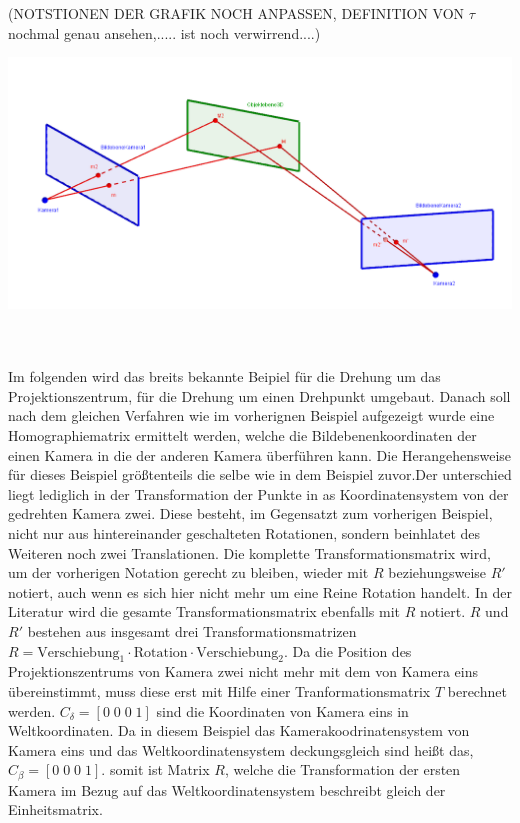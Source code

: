 (NOTSTIONEN DER GRAFIK NOCH ANPASSEN, DEFINITION VON $\tau$ nochmal genau ansehen,..... ist noch verwirrend....)

\begin{minipage}{\linewidth}
	\centering
	\includegraphics[width=1.\linewidth]{images/HomographieGrafik.png}
\end{minipage}\\ \\


Im folgenden wird das breits bekannte Beipiel für die Drehung um das Projektionszentrum, für die Drehung um einen Drehpunkt umgebaut. Danach soll nach dem gleichen Verfahren wie im vorherignen Beispiel aufgezeigt wurde eine Homographiematrix ermittelt werden, welche die Bildebenenkoordinaten der einen Kamera in die der anderen Kamera überführen kann. Die Herangehensweise für  dieses Beispiel größtenteils die selbe wie in dem Beispiel zuvor.Der unterschied liegt lediglich in der Transformation der Punkte in as Koordinatensystem von der gedrehten Kamera zwei. Diese besteht, im Gegensatzt zum vorherigen Beispiel, nicht nur aus hintereinander geschalteten Rotationen, sondern beinhlatet des Weiteren noch zwei Translationen. Die komplette Transformationsmatrix wird, um der vorherigen Notation gerecht zu bleiben, wieder mit $R$ beziehungsweise $R'$ notiert, auch wenn es sich hier nicht mehr um eine Reine Rotation handelt. In der Literatur wird die gesamte Transformationsmatrix ebenfalls mit $R$ notiert\cite{HZ,Elements,Schwarz}. $R$ und $R'$ bestehen aus insgesamt drei Transformationsmatrizen \ensuremath{R = \text{Verschiebung}_1 \cdot \text{Rotation} \cdot \text{Verschiebung}_2}. Da die Position des Projektionszentrums von Kamera zwei nicht mehr mit dem von Kamera eins übereinstimmt, muss diese erst mit Hilfe einer Tranformationsmatrix $T$ berechnet werden. $C_{\delta} = [0 \;0 \;0\; 1]$ sind die Koordinaten von Kamera eins in Weltkoordinaten. Da in diesem Beispiel das Kamerakoodrinatensystem von Kamera eins und das Weltkoordinatensystem deckungsgleich sind heißt das,  $C_{\beta} = [0 \;0 \;0\; 1]$. somit ist Matrix $R$, welche die Transformation der ersten Kamera im Bezug auf das Weltkoordinatensystem beschreibt gleich der Einheitsmatrix.

